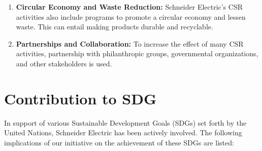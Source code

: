\begin{enumerate}
\item\textbf{Circular Economy and Waste Reduction:} Schneider Electric's CSR activities also include programs to promote a circular economy and lessen waste. This can entail making products durable and recyclable.

\item\textbf{Partnerships and Collaboration:} To increase the effect of many CSR activities, partnership with philanthropic groups, governmental organizations, and other stakeholders is used.

\end{enumerate}

\section{Contribution to SDG}
In support of various Sustainable Development Goals (SDGs) set forth by the United Nations, Schneider Electric has been actively involved. The following implications of our initiative on the achievement of these SDGs are listed: 


